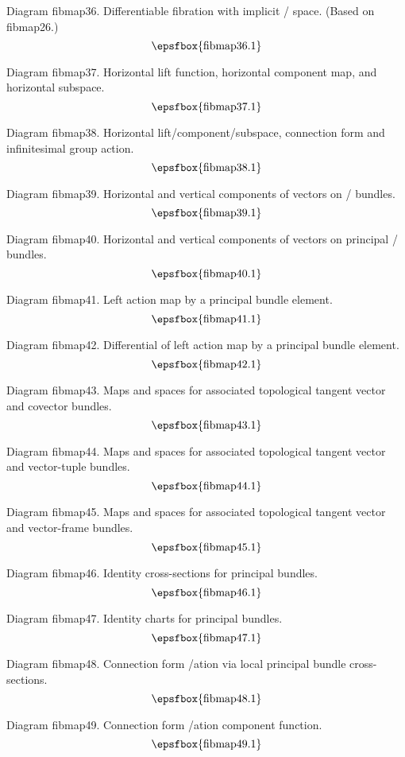 Diagram fibmap36. Differentiable fibration with implicit \fibre/ space. (Based
on fibmap26.)
$$
\centerline{\epsfbox{fibmap36.1}}
$$

Diagram fibmap37. Horizontal lift function, horizontal component map, and
horizontal subspace.
$$
\centerline{\epsfbox{fibmap37.1}}
$$

Diagram fibmap38. Horizontal lift/component/subspace, connection form and
infinitesimal group action.
$$
\centerline{\epsfbox{fibmap38.1}}
$$

Diagram fibmap39. Horizontal and vertical components of vectors on \fibre/
bundles.
$$
\centerline{\epsfbox{fibmap39.1}}
$$

\filleject

Diagram fibmap40. Horizontal and vertical components of vectors on principal
\fibre/ bundles.
$$
\centerline{\epsfbox{fibmap40.1}}
$$

Diagram fibmap41. Left action map by a principal bundle element.
$$
\centerline{\epsfbox{fibmap41.1}}
$$

Diagram fibmap42. Differential of left action map by a principal bundle element.
$$
\centerline{\epsfbox{fibmap42.1}}
$$

\filleject

Diagram fibmap43. Maps and spaces for associated topological tangent vector and
covector bundles.
$$
\centerline{\epsfbox{fibmap43.1}}
$$

Diagram fibmap44. Maps and spaces for associated topological tangent vector and
vector-tuple bundles.
$$
\centerline{\epsfbox{fibmap44.1}}
$$

Diagram fibmap45. Maps and spaces for associated topological tangent vector and
vector-frame bundles.
$$
\centerline{\epsfbox{fibmap45.1}}
$$

\filleject

Diagram fibmap46. Identity cross-sections for principal bundles.
$$
\centerline{\epsfbox{fibmap46.1}}
$$

Diagram fibmap47. Identity charts for principal bundles.
$$
\centerline{\epsfbox{fibmap47.1}}
$$

Diagram fibmap48. Connection form \localis/ation via local principal bundle
cross-sections.
$$
\centerline{\epsfbox{fibmap48.1}}
$$

Diagram fibmap49. Connection form \localis/ation component function.
$$
\centerline{\epsfbox{fibmap49.1}}
$$

